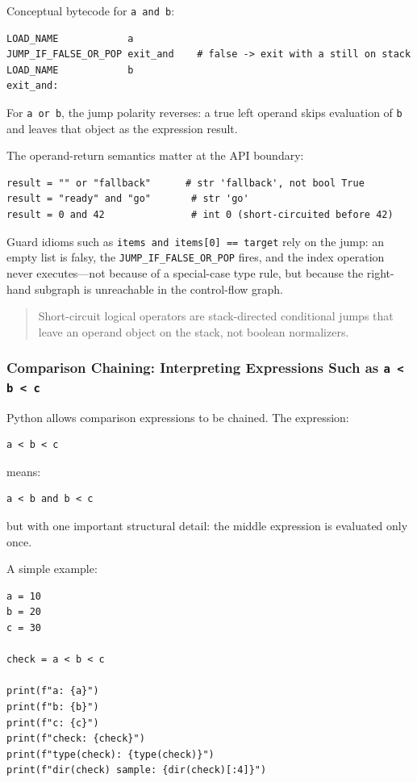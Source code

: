 Conceptual bytecode for \texttt{a and b}:

\begin{verbatim}
LOAD_NAME            a
JUMP_IF_FALSE_OR_POP exit_and    # false -> exit with a still on stack
LOAD_NAME            b
exit_and:
\end{verbatim}

For \texttt{a or b}, the jump polarity reverses: a true left operand skips evaluation of \texttt{b} and leaves that object as the expression result.

The operand-return semantics matter at the API boundary:

\begin{verbatim}
result = "" or "fallback"      # str 'fallback', not bool True
result = "ready" and "go"       # str 'go'
result = 0 and 42               # int 0 (short-circuited before 42)
\end{verbatim}

Guard idioms such as \texttt{items and items[0] == target} rely on the jump: an empty list is falsy, the \texttt{JUMP\_IF\_FALSE\_OR\_POP} fires, and the index operation never executes---not because of a special-case type rule, but because the right-hand subgraph is unreachable in the control-flow graph.

\begin{quote}
Short-circuit logical operators are stack-directed conditional jumps that leave an operand object on the stack, not boolean normalizers.
\end{quote}

\subsubsection{Comparison Chaining: Interpreting Expressions Such as \texttt{a < b < c}}

Python allows comparison expressions to be chained. The expression:

\begin{verbatim}
a < b < c
\end{verbatim}

means:

\begin{verbatim}
a < b and b < c
\end{verbatim}

but with one important structural detail: the middle expression is evaluated only once.

A simple example:

\begin{verbatim}
a = 10
b = 20
c = 30

check = a < b < c

print(f"a: {a}")
print(f"b: {b}")
print(f"c: {c}")
print(f"check: {check}")
print(f"type(check): {type(check)}")
print(f"dir(check) sample: {dir(check)[:4]}")
\end{verbatim}

